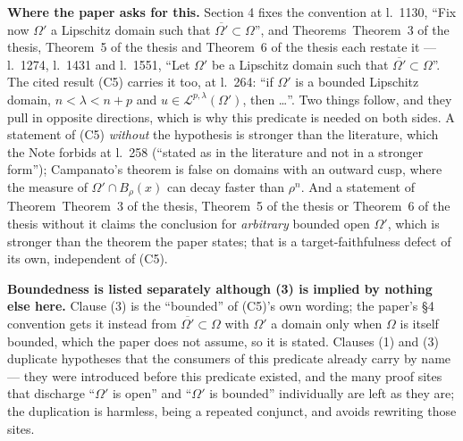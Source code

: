 \begin{definition}
\noindent\textbf{Where the paper asks for this.}  Section 4 fixes the convention
at l.~1130, ``Fix now $\Omega'$ a Lipschitz domain such that
$\overline{\Omega'}\subset\Omega$'', and Theorems~Theorem~3 of the thesis, Theorem~5 of the thesis and
Theorem~6 of the thesis each restate it --- l.~1274, l.~1431 and l.~1551, ``Let $\Omega'$ be
a Lipschitz domain such that $\overline{\Omega'}\subset\Omega$''.  The cited
result (C5) carries it too, at l.~264: ``if $\Omega'$ is a bounded Lipschitz
domain, $n<\lambda<n+p$ and $u\in\mathcal L^{p,\lambda}(\Omega')$, then
\ldots''.  Two things follow, and they pull in opposite directions, which is why
this predicate is needed on both sides.  A statement of (C5) \emph{without} the
hypothesis is stronger than the literature, which the Note forbids at l.~258
(``stated as in the literature and not in a stronger form''); Campanato's
theorem is false on domains with an outward cusp, where the measure of
$\Omega'\cap B_\rho(x)$ can decay faster than $\rho^n$.  And a statement of
Theorem~Theorem~3 of the thesis, Theorem~5 of the thesis or Theorem~6 of the thesis without it claims the
conclusion for \emph{arbitrary} bounded open $\Omega'$, which is stronger than
the theorem the paper states; that is a target-faithfulness defect of its own,
independent of (C5).

\noindent\textbf{Boundedness is listed separately although (3) is implied by
nothing else here.}  Clause (3) is the ``bounded'' of (C5)'s own wording; the
paper's \S4 convention gets it instead from $\overline{\Omega'}\subset\Omega$
with $\Omega'$ a domain only when $\Omega$ is itself bounded, which the paper
does not assume, so it is stated.  Clauses (1) and (3) duplicate hypotheses that
the consumers of this predicate already carry by name --- they were introduced
before this predicate existed, and the many proof sites that discharge
``$\Omega'$ is open'' and ``$\Omega'$ is bounded'' individually are left as they
are; the duplication is harmless, being a repeated conjunct, and avoids
rewriting those sites.
\end{definition}
